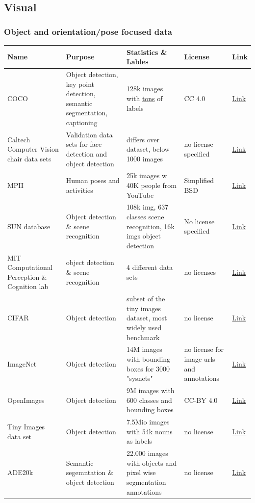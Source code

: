 \hypertarget{visual}{%
\subsection{Visual}\label{visual}}

\hypertarget{object-and-orientationpose-focused-data}{%
\subsubsection{Object and orientation/pose focused
data}\label{object-and-orientationpose-focused-data}}

\begin{longtable}[]{@{}p{}p{}p{}p{}p{}@{}}
\toprule
Name & Purpose & Statistics \& Lables & License & Link\tabularnewline
\midrule
\endhead
COCO & Object detection, key point detection, semantic segmentation,
captioning & 128k images with
\href{http://cocodataset.org/\#external}{tons} of labels & CC 4.0 &
\href{http://cocodataset.org/\#overview}{Link}\tabularnewline
Caltech Computer Vision chair data sets & Validation data sets for face
detection and object detection & differs over dataset, below 1000 images
& no license specified &
\href{http://www.vision.caltech.edu/html-files/archive.html}{Link}\tabularnewline
MPII & Human poses and activities & 25k images w 40K people from YouTube
& Simplified BSD &
\href{http://human-pose.mpi-inf.mpg.de/\#overview}{Link}\tabularnewline
SUN database & Object detection \& scene recognition & 108k img, 637
classes scene recognition, 16k imgs object detection & No license
specified &
\href{http://groups.csail.mit.edu/vision/SUN/hierarchy.html}{Link}\tabularnewline
MIT Computational Perception \& Cognition lab & object detection \&
scene recognition & 4 different data sets & no licenses &
\href{http://cvcl.mit.edu/MM/stimuli.html}{Link}\tabularnewline
CIFAR & Object detection & subset of the tiny images dataset, most
widely used benchmark & no license &
\href{http://www.cs.toronto.edu/~kriz/cifar.html}{Link}\tabularnewline
ImageNet & Object detection & 14M images with bounding boxes for 3000
"sysnets" & no license for image urls and annotations &
\href{http://image-net.org/download-imageurls}{Link}\tabularnewline
OpenImages & Object detection & 9M images with 600 classes and bounding
boxes & CC-BY 4.0 &
\href{https://storage.googleapis.com/openimages/web/factsfigures.html}{Link}\tabularnewline
Tiny Images data set & Object detection & 7.5Mio images with 54k nouns
as labels & no license &
\href{http://groups.csail.mit.edu/vision/TinyImages/}{Link}\tabularnewline
ADE20k & Semantic segemntation \& object detection & 22.000 images with
objects and pixel wise segmentation annotations & no license &
\href{http://groups.csail.mit.edu/vision/datasets/ADE20K/}{Link}\tabularnewline
\bottomrule
\end{longtable}


